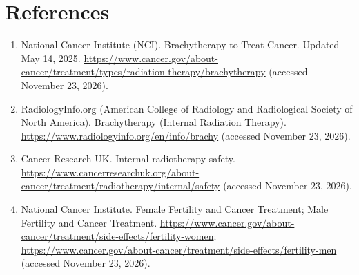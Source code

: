 \section*{References}
\begin{enumerate}
  \item National Cancer Institute (NCI). Brachytherapy to Treat Cancer. Updated May 14, 2025. \url{https://www.cancer.gov/about-cancer/treatment/types/radiation-therapy/brachytherapy} (accessed November 23, 2026).
  \item RadiologyInfo.org (American College of Radiology and Radiological Society of North America). Brachytherapy (Internal Radiation Therapy). \url{https://www.radiologyinfo.org/en/info/brachy} (accessed November 23, 2026).
  \item Cancer Research UK. Internal radiotherapy safety. \url{https://www.cancerresearchuk.org/about-cancer/treatment/radiotherapy/internal/safety} (accessed November 23, 2026).
  \item National Cancer Institute. Female Fertility and Cancer Treatment; Male Fertility and Cancer Treatment. \url{https://www.cancer.gov/about-cancer/treatment/side-effects/fertility-women}; \url{https://www.cancer.gov/about-cancer/treatment/side-effects/fertility-men} (accessed November 23, 2026).
\end{enumerate}

\clearpage
